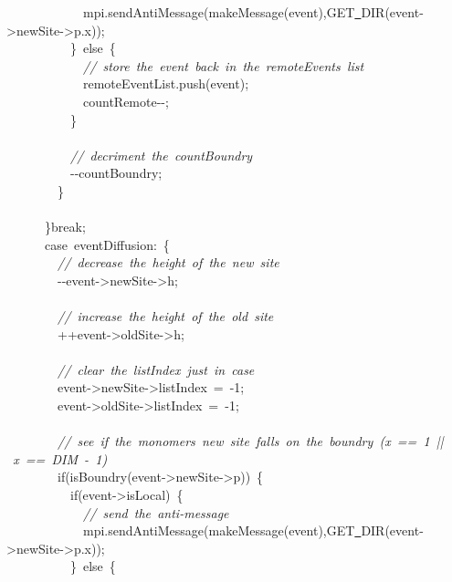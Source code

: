 {\ \ \ \ \ \ \ \ \ \ \ \ mpi.sendAntiMessage(makeMessage(event),GET\underline\ DIR(event-{}>{}newSite-{}>{}p.x));\\
\ \ \ \ \ \ \ \ \ \ \}\ else\ \{\\
\ \ \ \ \ \ \ \ \ \ \ \ \textsl{//\ store\ the\ event\ back\ in\ the\ remoteEvents\ list}\\
\ \ \ \ \ \ \ \ \ \ \ \ remoteEventList.push(event);\\
\ \ \ \ \ \ \ \ \ \ \ \ countRemote-{}-{};\\
\ \ \ \ \ \ \ \ \ \ \}\\
\ \\
\ \ \ \ \ \ \ \ \ \ \textsl{//\ decriment\ the\ countBoundry}\\
\ \ \ \ \ \ \ \ \ \ -{}-{}countBoundry;\\
\ \ \ \ \ \ \ \ \}\\
\ \\
\ \ \ \ \ \ \}break;\\
\ \ \ \ \ \ case\ eventDiffusion:\ \{\\
\ \ \ \ \ \ \ \ \textsl{//\ decrease\ the\ height\ of\ the\ new\ site}\\
\ \ \ \ \ \ \ \ -{}-{}event-{}>{}newSite-{}>{}h;\\
\ \\
\ \ \ \ \ \ \ \ \textsl{//\ increase\ the\ height\ of\ the\ old\ site}\\
\ \ \ \ \ \ \ \ ++event-{}>{}oldSite-{}>{}h;\\
\ \\
\ \ \ \ \ \ \ \ \textsl{//\ clear\ the\ listIndex\ just\ in\ case}\\
\ \ \ \ \ \ \ \ event-{}>{}newSite-{}>{}listIndex\ =\ -{}1;\\
\ \ \ \ \ \ \ \ event-{}>{}oldSite-{}>{}listIndex\ =\ -{}1;\\
\ \\
\ \ \ \ \ \ \ \ \textsl{//\ see\ if\ the\ monomers\ new\ site\ falls\ on\ the\ boundry\ (x\ ==\ 1\ ||\ x\ ==\ DIM\ -{}\ 1)}\\
\ \ \ \ \ \ \ \ if(isBoundry(event-{}>{}newSite-{}>{}p))\ \{\\
\ \ \ \ \ \ \ \ \ \ if(event-{}>{}isLocal)\ \{\\
\ \ \ \ \ \ \ \ \ \ \ \ \textsl{//\ send\ the\ anti-{}message}\\
\ \ \ \ \ \ \ \ \ \ \ \ mpi.sendAntiMessage(makeMessage(event),GET\underline\ DIR(event-{}>{}newSite-{}>{}p.x));\\
\ \ \ \ \ \ \ \ \ \ \}\ else\ \{\\
}

